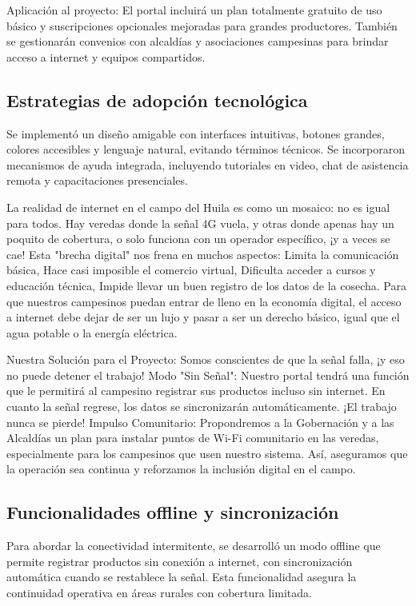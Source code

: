 Aplicación al proyecto: El portal incluirá un plan totalmente gratuito de uso básico y suscripciones opcionales mejoradas para grandes productores. También se gestionarán convenios con alcaldías y asociaciones campesinas para brindar acceso a internet y equipos compartidos.

\subsection{Estrategias de adopción tecnológica}
Se implementó un diseño amigable con interfaces intuitivas, botones grandes, colores accesibles y lenguaje natural, evitando términos técnicos. Se incorporaron mecanismos de ayuda integrada, incluyendo tutoriales en video, chat de asistencia remota y capacitaciones presenciales.

La realidad de internet en el campo del Huila es como un mosaico: no es igual para todos. Hay veredas donde la señal 4G vuela, y otras donde apenas hay un poquito de cobertura, o solo funciona con un operador específico, ¡y a veces se cae! Esta "brecha digital" nos frena en muchos aspectos: Limita la comunicación básica, Hace casi imposible el comercio virtual, Dificulta acceder a cursos y educación técnica, Impide llevar un buen registro de los datos de la cosecha. Para que nuestros campesinos puedan entrar de lleno en la economía digital, el acceso a internet debe dejar de ser un lujo y pasar a ser un derecho básico, igual que el agua potable o la energía eléctrica.

Nuestra Solución para el Proyecto: Somos conscientes de que la señal falla, ¡y eso no puede detener el trabajo! Modo "Sin Señal": Nuestro portal tendrá una función que le permitirá al campesino registrar sus productos incluso sin internet. En cuanto la señal regrese, los datos se sincronizarán automáticamente. ¡El trabajo nunca se pierde! Impulso Comunitario: Propondremos a la Gobernación y a las Alcaldías un plan para instalar puntos de Wi-Fi comunitario en las veredas, especialmente para los campesinos que usen nuestro sistema. Así, aseguramos que la operación sea continua y reforzamos la inclusión digital en el campo.

\subsection{Funcionalidades offline y sincronización}
Para abordar la conectividad intermitente, se desarrolló un modo offline que permite registrar productos sin conexión a internet, con sincronización automática cuando se restablece la señal. Esta funcionalidad asegura la continuidad operativa en áreas rurales con cobertura limitada.

